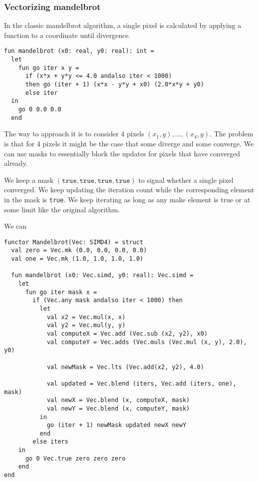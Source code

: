 \documentclass{article}
\begin{document}
\subsubsection{Vectorizing mandelbrot}

In the classic mandelbrot algorithm, a single pixel is calculated by applying a function to a coordinate until divergence.

\begin{lstlisting}
fun mandelbrot (x0: real, y0: real): int =
  let
    fun go iter x y =
      if (x*x + y*y <= 4.0 andalso iter < 1000)
      then go (iter + 1) (x*x - y*y + x0) (2.0*x*y + y0)
      else iter
  in
    go 0 0.0 0.0
  end
\end{lstlisting}

The way to approach it is to consider 4 pixels $(x_1, y), \ldots, (x_4, y)$. The problem is that for 4 pixels it might be the case that some diverge and some converge. We can use masks to essentially block the updates for pixels that have converged already.

We keep a mask $(\texttt{true}, \texttt{true}, \texttt{true}, \texttt{true})$ to signal whether a single pixel converged. We keep updating the iteration count while the corresponding element in the mask is \texttt{true}. We keep iterating as long as any make element is true or at some limit like the original algorithm.

We can 

\begin{lstlisting}
functor Mandelbrot(Vec: SIMD4) = struct
  val zero = Vec.mk (0.0, 0.0, 0.0, 0.0)
  val one = Vec.mk (1.0, 1.0, 1.0, 1.0)

  fun mandelbrot (x0: Vec.simd, y0: real): Vec.simd =
    let
      fun go iter mask x =
        if (Vec.any mask andalso iter < 1000) then
          let
            val x2 = Vec.mul(x, x)
            val y2 = Vec.mul(y, y)
            val computeX = Vec.add (Vec.sub (x2, y2), x0)
            val computeY = Vec.adds (Vec.muls (Vec.mul (x, y), 2.0), y0)

            val newMask = Vec.lts (Vec.add(x2, y2), 4.0)

            val updated = Vec.blend (iters, Vec.add (iters, one), mask)
            val newX = Vec.blend (x, computeX, mask)
            val newY = Vec.blend (x, computeY, mask)
          in
            go (iter + 1) newMask updated newX newY
          end
        else iters
    in
      go 0 Vec.true zero zero zero
    end
end
\end{lstlisting}
\end{document}
